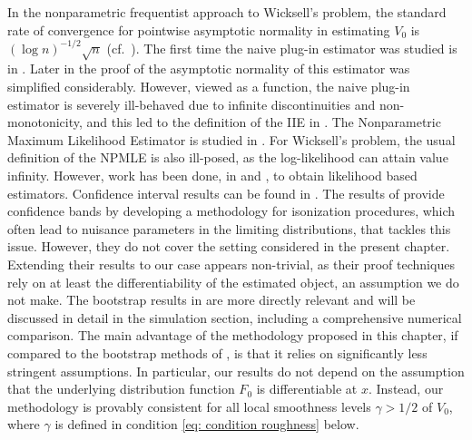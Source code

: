 In the nonparametric frequentist approach to Wicksell's problem, the standard rate of convergence for pointwise asymptotic normality in estimating \( V_0 \) is \( (\log n)^{-1/2} \sqrt{n} \) (cf.\ \cite{27, 1, 15}). The first time the naive plug-in estimator was studied is in \cite{15}. Later in \cite{1} the proof of the asymptotic normality of this estimator was simplified considerably. However, viewed as a function, the naive plug-in estimator is severely ill-behaved due to infinite discontinuities and non-monotonicity, and this led to the definition of the IIE in \cite{27,1}. 
The Nonparametric Maximum Likelihood Estimator is studied in \cite{18,3}. For Wicksell's problem, the usual definition of the NPMLE is also ill-posed, as the log-likelihood can attain value infinity. However, work has been done, in \cite{18} and \cite{3}, to obtain likelihood based estimators. Confidence interval results can be found in \cite{20,19}. The results of \cite{20} provide confidence bands by developing a methodology for isonization procedures, which often lead to nuisance parameters in the limiting distributions, that tackles this issue. However, they do not cover the setting considered in the present chapter. Extending their results to our case appears non-trivial, as their proof techniques rely on at least the differentiability of the estimated object, an assumption we do not make. The bootstrap results in \cite{19} are more directly relevant and will be discussed in detail in the simulation section, including a comprehensive numerical comparison. The main advantage of the methodology proposed in this chapter, if compared to the bootstrap methods of \cite{19}, is that it relies on significantly less stringent assumptions. In particular, our results do not depend on the assumption that the underlying distribution function $F_0$ is differentiable at $x$. Instead, our methodology is provably consistent for all local smoothness levels $\gamma > 1/2$ of $V_0$, where $\gamma$ is defined in condition \eqref{eq: condition roughness} below.


